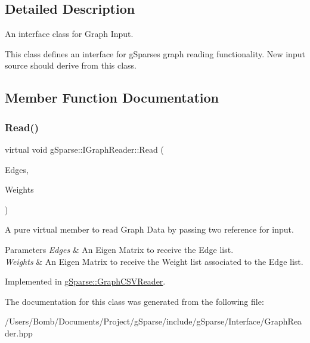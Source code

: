 \subsection{Detailed Description}
An interface class for Graph Input. 

This class defines an interface for g\+Sparse\textquotesingle{}s graph reading functionality. New input source should derive from this class. 

\subsection{Member Function Documentation}
\mbox{\label{classg_sparse_1_1_i_graph_reader_a42885505f5bdb8136b0d5b386925d1c7}} 
\subsubsection{\texorpdfstring{Read()}{Read()}}
{\footnotesize\ttfamily virtual void g\+Sparse\+::\+I\+Graph\+Reader\+::\+Read (\begin{DoxyParamCaption}\item[{g\+Sparse\+::\+Edge\+Matrix \&}]{Edges,  }\item[{g\+Sparse\+::\+Precision\+Row\+Matrix \&}]{Weights }\end{DoxyParamCaption})\hspace{0.3cm}{\ttfamily [pure virtual]}}



A pure virtual member to read Graph Data by passing two reference for input. 


\begin{DoxyParams}{Parameters}
{\em Edges} & An Eigen Matrix to receive the Edge list. \\
\hline
{\em Weights} & An Eigen Matrix to receive the Weight list associated to the Edge list. \\
\hline
\end{DoxyParams}


Implemented in \mbox{\hyperlink{classg_sparse_1_1_graph_c_s_v_reader_a01218efe45c694d0b721e737e9c53365}{g\+Sparse\+::\+Graph\+C\+S\+V\+Reader}}.



The documentation for this class was generated from the following file\+:\begin{DoxyCompactItemize}
\item 
/\+Users/\+Bomb/\+Documents/\+Project/g\+Sparse/include/g\+Sparse/\+Interface/Graph\+Reader.\+hpp\end{DoxyCompactItemize}
